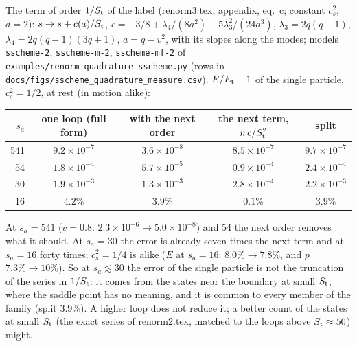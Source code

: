 \documentclass[11pt,aps,preprint,nofootinbib,superscriptaddress,tightenlines]{revtex4-2}
\begin{document}
The term of order $1/S_{\rm t}$ of the label (renorm3.tex, appendix, eq.~c; constant $c_s^2$, $d=2$):
$s\to s+c(a)/S_{\rm t}$, $c=-3/8+\lambda_4/(8a^2)-5\lambda_3^2/(24a^3)$, $\lambda_3=2q(q-1)$, $\lambda_4=2q(q-1)(3q+1)$, $a=q-v^2$, with its
slopes along the modes; models \texttt{sscheme-2}, \texttt{sscheme-m-2}, \texttt{sscheme-mf-2} of \nolinkurl{examples/renorm_quadrature_sscheme.py}
(rows in \texttt{docs/figs/sscheme\_quadrature\_measure.csv}).  $E/E_{\rm t}-1$ of the single particle, $c_s^2=1/2$, at rest (in motion alike):
\begin{center}\small
\begin{tabular}{rcccc}
\toprule
$s_a$ & one loop (full form) & with the next order & the next term, $n\,c/S_{\rm t}^2$ & split \\
\midrule
541 & $9.2\times10^{-7}$ & $3.6\times10^{-8}$ & $8.5\times10^{-7}$ & $9.7\times10^{-7}$ \\
54 & $1.8\times10^{-4}$ & $5.7\times10^{-5}$ & $0.9\times10^{-4}$ & $2.4\times10^{-4}$ \\
30 & $1.9\times10^{-3}$ & $1.3\times10^{-3}$ & $2.8\times10^{-4}$ & $2.2\times10^{-3}$ \\
16 & $4.2\%$ & $3.9\%$ & $0.1\%$ & $3.9\%$ \\
\bottomrule
\end{tabular}
\end{center}
At $s_a=541$ ($v=0.8$: $2.3\times10^{-6}\to5.0\times10^{-8}$) and 54 the next order removes what it should.  At $s_a=30$ the error is already
seven times the next term and at $s_a=16$ forty times; $c_s^2=1/4$ is alike ($E$ at $s_a=16$: $8.0\%\to7.8\%$, and $p$ $7.3\%\to10\%$).  So at
$s_a\lesssim30$ the error of the single particle is not the truncation of the series in $1/S_{\rm t}$: it comes from the states near the boundary at
small $S_{\rm t}$, where the saddle point has no meaning, and it is common to every member of the family (split $3.9\%$).  A higher loop does not
reduce it; a better count of the states at small $S_{\rm t}$ (the exact series of renorm2.tex, matched to the loops above $S_{\rm t}\approx50$) might.
\end{document}
